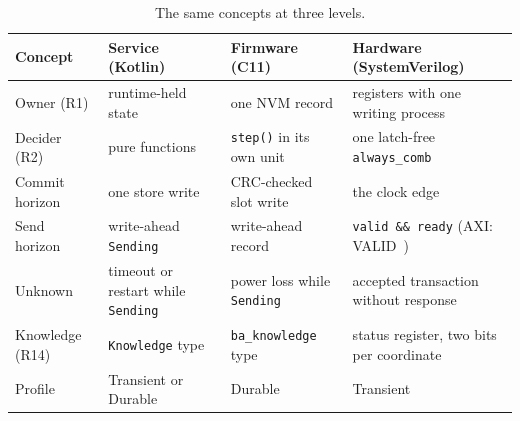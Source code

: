 \documentclass[11pt]{article}
\theoremstyle{definition}
\theoremstyle{plain}
\newcommand{\Unknown}{\textsf{Unknown}}
\begin{document}
\begin{table}[t]
\centering\small
\begin{tabularx}{\textwidth}{@{}l>{\raggedright\arraybackslash}X>{\raggedright\arraybackslash}X>{\raggedright\arraybackslash}X@{}}
\toprule
Concept & Service (Kotlin) & Firmware (C11) & Hardware (SystemVerilog) \\
\midrule
Owner (R1) & runtime-held state & one NVM record & registers with one writing process \\
Decider (R2) & pure functions & \texttt{step()} in its own unit & one latch-free \texttt{always\_comb} \\
Commit horizon & one store write & CRC-checked slot write & the clock edge \\
Send horizon & write-ahead \texttt{Sending} & write-ahead record & \texttt{valid \&\& ready} (AXI: VALID~\citep{ArmAXI}) \\
\Unknown & timeout or restart while \texttt{Sending} & power loss while \texttt{Sending} & accepted transaction without response \\
Knowledge (R14) & \texttt{Knowledge} type & \texttt{ba\_knowledge} type & status register, two bits per coordinate \\
Profile & Transient or Durable & Durable & Transient \\
\bottomrule
\end{tabularx}
\caption{The same concepts at three levels.}
\label{tab:levels}
\end{table}
\end{document}
